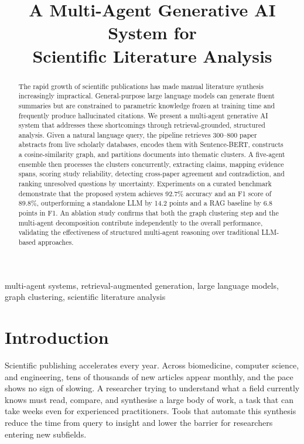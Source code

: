 \documentclass[conference]{IEEEtran}
\begin{document}
\title{A Multi-Agent Generative AI System for\\Scientific Literature Analysis}

\author{
}

\maketitle

\begin{abstract}
The rapid growth of scientific publications has made manual literature
synthesis increasingly impractical. General-purpose large language models
can generate fluent summaries but are constrained to parametric knowledge
frozen at training time and frequently produce hallucinated citations. We
present a multi-agent generative AI system that addresses these shortcomings
through retrieval-grounded, structured analysis. Given a natural language
query, the pipeline retrieves 300--800 paper abstracts from live scholarly
databases, encodes them with Sentence-BERT, constructs a cosine-similarity
graph, and partitions documents into thematic clusters. A five-agent ensemble
then processes the clusters concurrently, extracting claims, mapping evidence
spans, scoring study reliability, detecting cross-paper agreement and
contradiction, and ranking unresolved questions by uncertainty. Experiments on
a curated benchmark demonstrate that the proposed system achieves 92.7\%
accuracy and an F1 score of 89.8\%, outperforming a standalone LLM by 14.2
points and a RAG baseline by 6.8 points in F1. An ablation study confirms that
both the graph clustering step and the multi-agent decomposition contribute
independently to the overall performance, validating the effectiveness of
structured multi-agent reasoning over traditional LLM-based approaches.
\end{abstract}

\begin{IEEEkeywords}
multi-agent systems, retrieval-augmented generation, large language models,
graph clustering, scientific literature analysis
\end{IEEEkeywords}

\section{Introduction}
Scientific publishing accelerates every year. Across biomedicine, computer
science, and engineering, tens of thousands of new articles appear monthly,
and the pace shows no sign of slowing. A researcher trying to understand what
a field currently knows must read, compare, and synthesise a large body of
work, a task that can take weeks even for experienced practitioners. Tools
that automate this synthesis reduce the time from query to insight and lower
the barrier for researchers entering new subfields.
\end{document}
